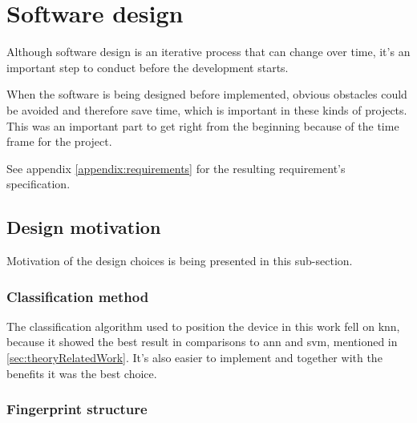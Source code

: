 \section{Software design}\label{sec:methodSoftwareDesign}
Although software design is an iterative process that can change over time, it's an important step to conduct before the development starts. \cite{EngineeringDesignIts1989, ImportanceBusinessProcess2008}

\bigskip

When the software is being designed before implemented, obvious obstacles could be avoided and therefore save time, which is important in these kinds of projects.
This was an important part to get right from the beginning because of the time frame for the project.

\bigskip

See appendix \ref{appendix:requirements} for the resulting requirement's specification.


\subsection{Design motivation}\label{sec:methodDesignMotivation}
Motivation of the design choices is being presented in this sub-section.


\subsubsection{Classification method}\label{sec:methodSoftwareDesignClassification}
The classification algorithm used to position the device in this work fell on \acrfull{knn}, because it showed the best result in comparisons to \acrlong{ann} and \acrlong{svm}, mentioned in \cref{sec:theoryRelatedWork}.
It's also easier to implement and together with the benefits it was the best choice.


\subsubsection{Fingerprint structure}\label{sec:methodSoftwareDesignFingerprint}


